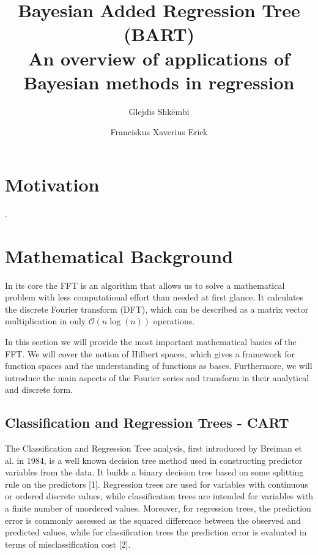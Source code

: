 \documentclass{usiinftr}
\begin{document}
\title{\bf Bayesian Added Regression Tree (BART) \\ {\normalfont An overview of applications of Bayesian methods in regression }}
\author{Glejdis Shk\"embi}{\dagger}
\author{Franciskus Xaverius Erick}{\dagger}


%
%

\maketitle

\begin{abstract}

\end{abstract}

\section{Motivation}
.
\section{Mathematical Background}
In its core the FFT is an algorithm that allows us to solve a mathematical problem with less computational effort than needed at first glance.
It calculates the discrete Fourier transform (DFT), which can be described as a matrix vector multiplication in only $\mathcal{O}(n\log(n))$ operations\cite{cochran1967fast}. 

In this section we will provide the most important mathematical basics of the FFT. We will cover the notion of Hilbert spaces, which gives a framework for function spaces and the understanding of functions as bases.
Furthermore, we will introduce the main aspects of the Fourier series and transform in their analytical and discrete form.

\subsection{Classification and Regression Trees - CART}
The Classification and Regression Tree analysis, first introduced by Breiman et al. in 1984, is a well known decision tree method used in constructing predictor variables from the data. It builds a binary decision tree based on some splitting rule on the predictors [1]. Regression trees are used for variables with continuous or ordered discrete values, while classification trees are intended for variables with a finite number of unordered values. Moreover, for regression trees, the prediction error is commonly assessed as the squared difference between the observed and predicted values, while for classification trees the prediction error is evaluated in terms of misclassification cost [2].
\end{document}

